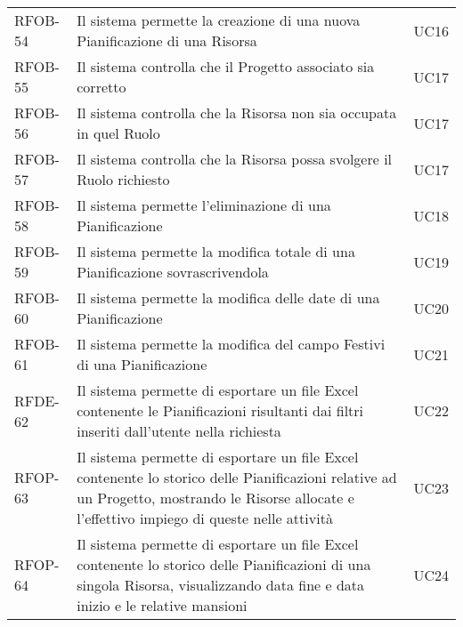 \begin{center}
\begin{longtable}{p{2.0cm}|p{8cm}|p{2.7cm}}
RFOB-54  & Il sistema permette la creazione di una nuova Pianificazione di una Risorsa & UC16 \\  
RFOB-55  & Il sistema controlla che il Progetto associato sia corretto & UC17 \\ 
RFOB-56  & Il sistema controlla che la Risorsa non sia occupata in quel Ruolo & UC17 \\ 
RFOB-57  & Il sistema controlla che la Risorsa possa svolgere il Ruolo richiesto & UC17 \\ 
RFOB-58  & Il sistema permette l'eliminazione di una Pianificazione  & UC18 \\ 
RFOB-59 & Il sistema permette la modifica totale di una Pianificazione sovrascrivendola & UC19\\
RFOB-60 & Il sistema permette la modifica delle date di una Pianificazione & UC20\\
RFOB-61 & Il sistema permette la modifica del campo Festivi di una Pianificazione & UC21\\
RFDE-62 & Il sistema permette di esportare un file Excel contenente le Pianificazioni risultanti dai filtri inseriti dall'utente nella richiesta & UC22\\
\hypertarget{rf63}{RFOP-63} & Il sistema permette di esportare un file Excel contenente lo storico delle Pianificazioni relative ad un Progetto, mostrando le Risorse allocate e l'effettivo impiego di queste nelle attività & UC23\\
\hypertarget{rf64}{RFOP-64} &  Il sistema permette di esportare un file Excel contenente lo storico delle Pianificazioni di una singola Risorsa, visualizzando data fine e data inizio e le relative mansioni & UC24\\


\end{longtable}
\end{center}
